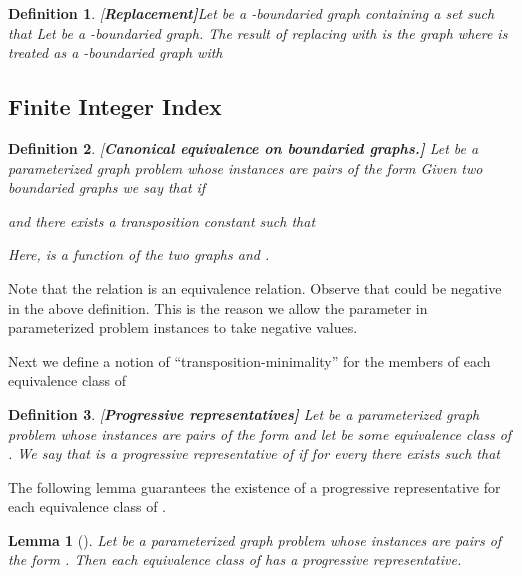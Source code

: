 \documentclass[11pt]{article}
\newtheorem{lemma}{Lemma}
\newtheorem{definition}{Definition}
\newcommand{\term}[1]{#1}
\begin{document}
\begin{definition}{\rm [\bf Replacement]}\label{defn:replacement}
Let  be a -boundaried graph containing a set 
such that  Let  be a -boundaried graph. The result of {\em replacing  with } is the graph 
where  is treated as a -boundaried graph with  
\end{definition}













\subsection{Finite Integer Index}
\label{subsec:finiinteginde}
\begin{definition}{\rm [\bf Canonical equivalence on boundaried graphs.]}
Let  be a parameterized graph problem whose instances are pairs of the form 
 Given two boundaried graphs  we say that \term{} if 

 and there exists a \term{{\em transposition constant}}
 such that 

Here,  is a function of the two graphs  and . 
\end{definition}
Note that  the relation   is
an equivalence relation. Observe that  could be negative in the above definition. This is the reason we allow the parameter in parameterized problem instances to take negative values.  


Next  we define a notion of ``transposition-minimality'' for the members 
of  each equivalence class of 


\begin{definition}{\rm [\bf Progressive representatives]}
\label{def:progrepr}
Let  be a parameterized graph problem whose instances are pairs of the form 
and let  be some equivalence class of . We say that  is a \term{{\em progressive 
representative}}
of  if for every 
there exists  such that 

\end{definition}

The following lemma guarantees the existence of a progressive representative for each equivalence class of 
. 



\begin{lemma}[\cite{H.Bodlaender:2009ng}]
\label{lem:existprog}
Let  be a parameterized graph problem whose instances are pairs of the form .
Then each  equivalence class of  has a progressive representative.
\end{lemma}
\end{document}
